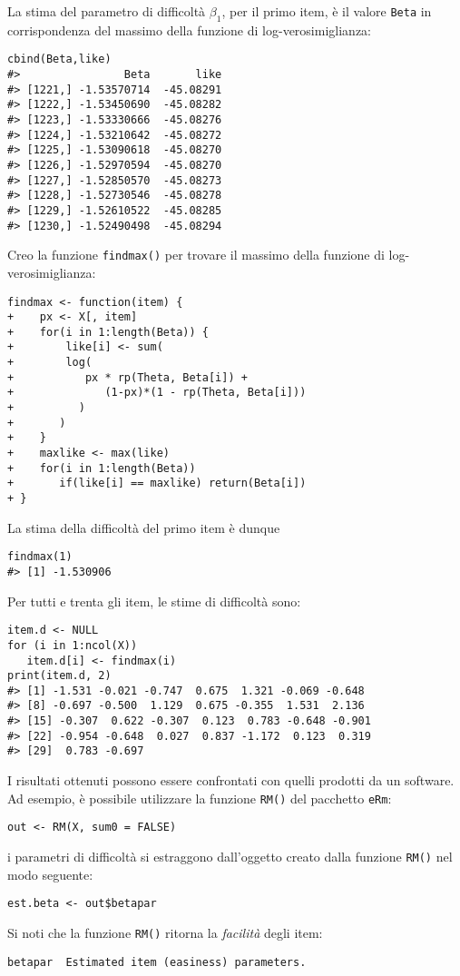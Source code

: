 La stima del parametro di difficoltà $\beta_1$, per il primo item, è il valore {\tt Beta} in corrispondenza del massimo della funzione di log-verosimiglianza: 
\begin{lstlisting}
cbind(Beta,like)
#>                Beta       like
#> [1221,] -1.53570714  -45.08291
#> [1222,] -1.53450690  -45.08282
#> [1223,] -1.53330666  -45.08276
#> [1224,] -1.53210642  -45.08272
#> [1225,] -1.53090618  -45.08270
#> [1226,] -1.52970594  -45.08270
#> [1227,] -1.52850570  -45.08273
#> [1228,] -1.52730546  -45.08278
#> [1229,] -1.52610522  -45.08285
#> [1230,] -1.52490498  -45.08294
\end{lstlisting} 
Creo la funzione {\tt findmax()} per trovare il massimo della funzione di log-verosimiglianza:
\begin{lstlisting}
findmax <- function(item) {
+    px <- X[, item]
+    for(i in 1:length(Beta)) {
+        like[i] <- sum(
+        log(
+           px * rp(Theta, Beta[i]) +
+              (1-px)*(1 - rp(Theta, Beta[i]))
+          )
+       )
+    }
+    maxlike <- max(like)
+    for(i in 1:length(Beta)) 
+       if(like[i] == maxlike) return(Beta[i])
+ }
\end{lstlisting} 
La stima della difficoltà del primo item è dunque
\begin{lstlisting}
findmax(1)
#> [1] -1.530906
\end{lstlisting} 
Per tutti e trenta gli item, le stime di difficoltà sono:
\begin{lstlisting}
item.d <- NULL
for (i in 1:ncol(X)) 
   item.d[i] <- findmax(i) 
print(item.d, 2)
#> [1] -1.531 -0.021 -0.747  0.675  1.321 -0.069 -0.648
#> [8] -0.697 -0.500  1.129  0.675 -0.355  1.531  2.136
#> [15] -0.307  0.622 -0.307  0.123  0.783 -0.648 -0.901
#> [22] -0.954 -0.648  0.027  0.837 -1.172  0.123  0.319
#> [29]  0.783 -0.697
\end{lstlisting} 
I risultati ottenuti possono essere confrontati con quelli prodotti da un software. Ad esempio, è possibile utilizzare la funzione {\tt RM()} del pacchetto {\tt eRm}:
\begin{lstlisting}
out <- RM(X, sum0 = FALSE)
\end{lstlisting} %
i parametri di difficoltà si estraggono dall'oggetto creato dalla funzione {\tt RM()} nel modo seguente:
\begin{lstlisting}
est.beta <- out$betapar
\end{lstlisting} %
Si noti che la funzione {\tt RM()} ritorna la {\it facilità} degli item:
\begin{lstlisting}
betapar	 Estimated item (easiness) parameters.
\end{lstlisting} %
